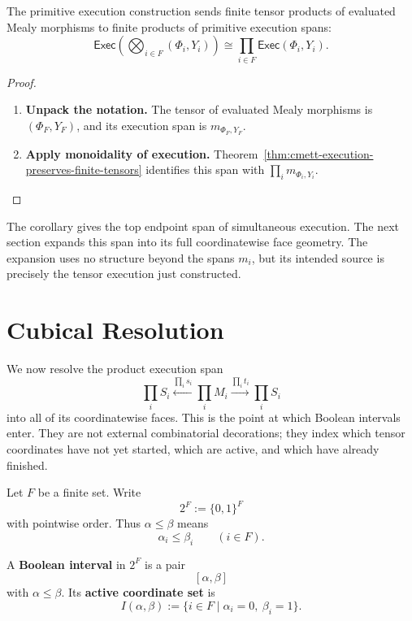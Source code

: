 \begin{corollary}
\label{cor:cmett-execution-is-monoidal}
    The primitive execution construction sends finite tensor products of
    evaluated Mealy morphisms to finite products of primitive execution spans:
    \[
        \mathsf{Exec}\left(\bigotimes_{i\in F}(\Phi_i,Y_i)\right)
        \cong
        \prod_{i\in F}\mathsf{Exec}(\Phi_i,Y_i).
    \]
\end{corollary}

\begin{proof}
    \leavevmode
    \begin{enumerate}
        \item \textbf{Unpack the notation.}
        The tensor of evaluated Mealy morphisms is \((\Phi_F,Y_F)\), and its
        execution span is \(m_{\Phi_F,Y_F}\).

        \item \textbf{Apply monoidality of execution.}
        Theorem~\ref{thm:cmett-execution-preserves-finite-tensors}
        identifies this span with \(\prod_i m_{\Phi_i,Y_i}\).
    \end{enumerate}
\end{proof}

The corollary gives the top endpoint span of simultaneous execution. The next
section expands this span into its full coordinatewise face geometry. The
expansion uses no structure beyond the spans \(m_i\), but its intended source
is precisely the tensor execution just constructed.

\section{Cubical Resolution}
\label{sec:cmett-cubical-resolution}

We now resolve the product execution span
\[
    \prod_iS_i
    \xleftarrow{\prod_i s_i}
    \prod_iM_i
    \xrightarrow{\prod_i t_i}
    \prod_iS_i
\]
into all of its coordinatewise faces. This is the point at which Boolean
intervals enter. They are not external combinatorial decorations; they index
which tensor coordinates have not yet started, which are active, and which
have already finished.

Let \(F\) be a finite set. Write
\[
    2^F:=\{0,1\}^F
\]
with pointwise order. Thus \(\alpha\leq\beta\) means
\[
    \alpha_i\leq\beta_i
    \qquad
    (i\in F).
\]

\begin{definition}
\label{def:cmett-boolean-interval}
    A \textbf{Boolean interval} in \(2^F\) is a pair
    \[
        [\alpha,\beta]
    \]
    with \(\alpha\leq\beta\). Its \textbf{active coordinate set} is
    \[
        I(\alpha,\beta)
        :=
        \{i\in F\mid \alpha_i=0,\ \beta_i=1\}.
    \]
\end{definition}

